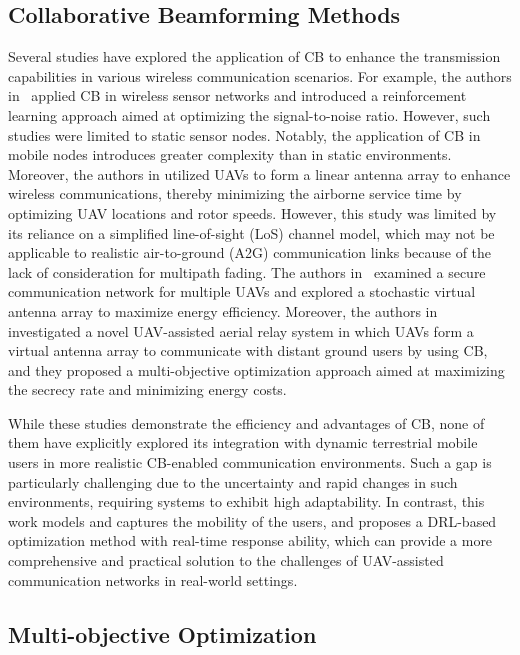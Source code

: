 \documentclass[10pt,journal,compsoc]{IEEEtran}
\begin{document}
\subsection{Collaborative Beamforming Methods}
\label{subsec:Collaborative Beamforming}

\par Several studies have explored the application of CB to enhance the transmission capabilities in various wireless communication scenarios. For example, the authors in~\cite{Bao2019astochastic} applied CB in wireless sensor networks and introduced a reinforcement learning approach aimed at optimizing the signal-to-noise ratio. However, such studies were limited to static sensor nodes. Notably, the application of CB in mobile nodes introduces greater complexity than in static environments. Moreover, the authors in  \cite{Mozaffari2019communicationsandcontrol} utilized UAVs to form a linear antenna array to enhance wireless communications, thereby minimizing the airborne service time by optimizing UAV locations and rotor speeds. However, this study was limited by its reliance on a simplified line-of-sight (LoS) channel model, which may not be applicable to realistic air-to-ground (A2G) communication links because of the lack of consideration for multipath fading. The authors in~\cite{Jung2022securityenergy} examined a secure communication network for multiple UAVs and explored a stochastic virtual antenna array to maximize energy efficiency. Moreover, the authors in~\cite{sun2022secure} investigated a novel UAV-assisted aerial relay system in which UAVs form a virtual antenna array to communicate with distant ground users by using CB, and they proposed a multi-objective optimization approach aimed at maximizing the secrecy rate and minimizing energy costs. 

\par While these studies demonstrate the efficiency and advantages of CB, none of them have explicitly explored its integration with dynamic terrestrial mobile users in more realistic CB-enabled communication environments. Such a gap is particularly challenging due to the uncertainty and rapid changes in such environments, requiring systems to exhibit high adaptability. In contrast, this work models and captures the mobility of the users, and proposes a DRL-based optimization method with real-time response ability, which can provide a more comprehensive and practical solution to the challenges of UAV-assisted communication networks in real-world settings.


\subsection{Multi-objective Optimization}
\label{Multi-objective Optimization}
\end{document}
